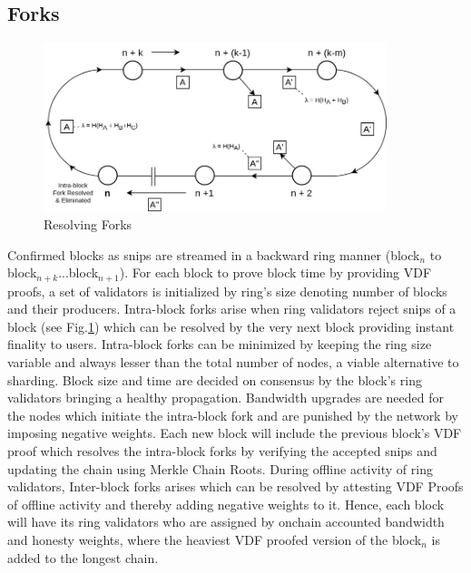 \documentclass[a4paper,10pt]{article}
\begin{document}
 \subsection{Forks}
\begin{figure}[h]
\begin{center}
\includegraphics[width=10cm]{intrafork}
\caption{Resolving Forks}
\label{fork}
\end{center}
\end{figure}
Confirmed blocks as snips are streamed in a backward ring manner (block$_n$ to block$_{n+k}$...block$_{n+1}$). For each block to prove block time by providing VDF proofs, a set of validators is initialized by ring's size denoting number of blocks and their producers. Intra-block forks arise when ring validators reject snips of a block (see Fig.\ref{fork}) which can be resolved by the very next block providing instant finality to users. Intra-block forks can be minimized by keeping the ring size variable and always lesser than the total number of nodes, a viable alternative to sharding. Block size and time are decided on consensus by the block's ring validators bringing a healthy propagation. Bandwidth upgrades are needed for the nodes which initiate the intra-block fork and are punished by the network by imposing negative weights. Each new block will include the previous block's VDF proof which resolves the intra-block forks by verifying the accepted snips and updating the chain using Merkle Chain Roots. During offline activity of ring validators, Inter-block forks arises which can be resolved by attesting VDF Proofs of offline activity and thereby adding negative weights to it. Hence, each block will have its ring validators who are assigned by onchain accounted bandwidth and honesty weights, where the heaviest VDF proofed version of the block$_n$ is added to the longest chain.
\end{document}
